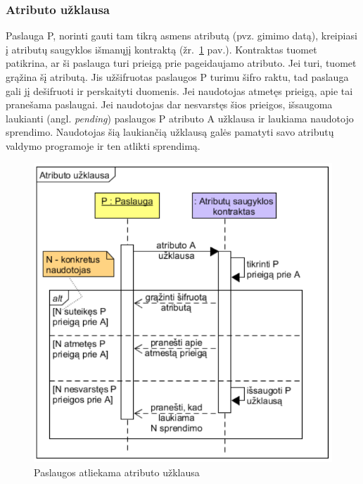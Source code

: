 \subsubsection{Atributo užklausa} \label{BCIDM:askForAttribute}

Paslauga P, norinti gauti tam tikrą asmens atributą (pvz. gimimo datą),
kreipiasi į atributų saugyklos išmanųjį kontraktą (žr.\hypertarget{fig:askForAttributeSequence}{~\ref{fig:askForAttributeSequence} pav.}).
Kontraktas tuomet patikrina, ar ši paslauga turi prieigą prie pageidaujamo atributo. Jei turi, tuomet grąžina šį atributą. Jis
užšifruotas paslaugos P turimu šifro raktu, tad paslauga gali jį dešifruoti ir perskaityti duomenis. Jei
naudotojas atmetęs prieigą, apie tai pranešama paslaugai. Jei naudotojas dar nesvarstęs šios prieigos, išsaugoma laukianti
(angl. \textit{pending}) paslaugos P atributo A užklausa ir laukiama naudotojo sprendimo. Naudotojas šią laukiančią užklausą galės pamatyti savo 
atributų valdymo programoje ir ten atlikti sprendimą.

\begin{figure}[H]
    \centering
    \includegraphics[scale=0.85]{img/askForAttributeSequence}
    \caption{Paslaugos atliekama atributo užklausa}
    \label{fig:askForAttributeSequence}
\end{figure}

